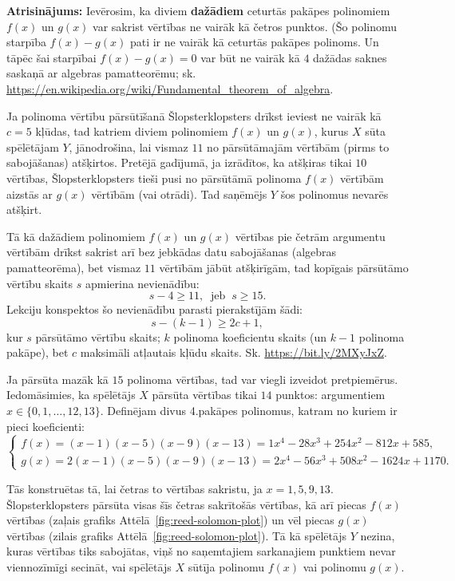 \documentclass[11pt]{article}
\begin{document}
\vspace{6pt}
{\bf Atrisinājums:} Ievērosim, ka diviem {\bf dažādiem} ceturtās pakāpes polinomiem
$f(x)$ un $g(x)$ var sakrist vērtības ne vairāk kā
četros punktos. (Šo polinomu starpība $f(x)-g(x)$ pati ir ne vairāk kā ceturtās pakāpes polinoms.
Un tāpēc šai starpībai $f(x) - g(x) = 0$ var būt ne vairāk kā $4$ dažādas saknes saskaņā ar
algebras pamatteorēmu; sk. \url{https://en.wikipedia.org/wiki/Fundamental_theorem_of_algebra}.

Ja polinoma vērtību pārsūtīšanā Šlopsterklopsters drīkst ieviest ne vairāk kā $c=5$ kļūdas,
tad katriem diviem polinomiem $f(x)$ un $g(x)$, kurus $X$ sūta spēlētājam $Y$, jānodrošina, lai vismaz $11$ no
pārsūtāmajām vērtībām (pirms to sabojāšanas) atšķirtos. Pretējā gadījumā, ja izrādītos, ka
atšķiras tikai $10$ vērtības, Šlopsterklopsters tieši pusi no pārsūtāmā polinoma $f(x)$ vērtībām aizstās ar $g(x)$ vērtībām 
(vai otrādi). Tad saņēmējs $Y$ šos polinomus nevarēs atšķirt.

Tā kā dažādiem polinomiem $f(x)$ un $g(x)$ vērtības pie četrām argumentu vērtībām drīkst sakrist 
arī bez jebkādas datu sabojāšanas (algebras pamatteorēma), bet vismaz $11$ vērtībām jābūt atšķirīgām, tad 
kopīgais pārsūtāmo vērtību skaits $s$ apmierina nevienādību: 
$$s - 4 \geq 11,\;\;\text{jeb}\;\;s \geq 15.$$
Lekciju konspektos šo nevienādību parasti pierakstījām šādi:
$$s - (k-1) \geq 2c + 1,$$
kur $s$ \textendash{} pārsūtāmo vērtību skaits; $k$ \textendash{} polinoma koeficientu skaits (un $k-1$ \textendash{} 
polinoma pakāpe), bet $c$ \textendash{} maksimāli atļautais kļūdu skaits.
Sk. \url{https://bit.ly/2MXyJxZ}. 

Ja pārsūta mazāk kā $15$ polinoma vērtības, tad var viegli izveidot pretpiemērus. Iedomāsimies, ka 
spēlētājs $X$ pārsūta vērtības tikai $14$ punktos: argumentiem $x \in \{ 0,1,\ldots,12,13 \}$. 
Definējam divus 4.pakāpes polinomus, katram no kuriem ir pieci koeficienti:
$$ \left\{ 
\begin{array}{l}
f(x) = (x-1)(x-5)(x-9)(x-13) = 1 x^4 - 28 x^3 + 254 x^2 - 812x + 585,\\
g(x) = 2(x-1)(x-5)(x-9)(x-13) = 2 x^4 - 56 x^3 + 508 x^2 - 1624x + 1170.
\end{array} \right.$$

Tās konstruētas tā, lai četras to vērtības sakristu, ja $x = 1,5,9,13$. Šlopsterklopsters 
pārsūta visas šīs četras sakrītošās vērtības, kā arī piecas $f(x)$ vērtības (zaļais grafiks Attēlā~\ref{fig:reed-solomon-plot}) un 
vēl piecas $g(x)$ vērtības (zilais grafiks Attēlā~\ref{fig:reed-solomon-plot}). Tā kā spēlētājs $Y$ nezina, kuras vērtības 
tiks sabojātas, viņš no saņemtajiem sarkanajiem punktiem nevar viennozīmīgi secināt, vai spēlētājs $X$ 
sūtīja polinomu $f(x)$ vai polinomu $g(x)$. 
\end{document}
